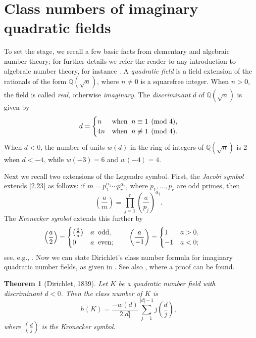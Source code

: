 \documentclass{amsart}
\theoremstyle{plain}
\newtheorem{theorem}{Theorem}[section]
\numberwithin{equation}{section}
\begin{document}
\section{Class numbers of imaginary quadratic fields}\label{sec:4}

To set the stage, we recall a few basic facts from elementary and algebraic
number theory; for further details we refer the reader to any introduction  to
algebraic number theory, for instance \cite{AW}. A {\it quadratic field} is a
field extension of the rationals of the form ${\mathbb Q}(\sqrt{n})$, where
$n\neq 0$ is a squarefree integer. When $n>0$, the field is called {\it real\/},
otherwise {\it imaginary\/}. The {\it discriminant} $d$ of 
${\mathbb Q}(\sqrt{n})$ is given by
\begin{equation}\label{3.1}
d = \begin{cases}
n &\hbox{when}\;\;n\equiv 1\pmod{4},\\
4n &\hbox{when}\;\;n\not\equiv 1\pmod{4}.
\end{cases}
\end{equation}
When $d<0$, the number of units $w(d)$ in the ring of integers of 
${\mathbb Q}(\sqrt{n})$ is 2 when $d<-4$, while $w(-3)=6$ and $w(-4)=4$.

Next we recall two extensions of the Legendre symbol. First,
the {\it Jacobi symbol} extends \eqref{2.23} as follows: if 
$m=p_1^{\alpha_1}\cdots p_r^{\alpha_r}$, where $p_1,\ldots,p_r$ are odd primes,
then 
\[
\left(\frac{a}{m}\right) = \prod_{j=1}^r\left(\frac{a}{p_j}\right)^{\alpha_j}.
\]
The {\it Kronecker symbol} extends this further by
\[
\left(\frac{a}{2}\right) = \begin{cases}
\left(\frac{2}{a}\right) &a\;\;\hbox{odd},\\
0&a\;\;\hbox{even};
\end{cases}\qquad
\left(\frac{a}{-1}\right) = \begin{cases}
1 &a>0,\\
-1 &a<0;
\end{cases}\qquad
\]
see, e.g., \cite[p.~36]{Co1}. Now we can state Dirichlet's class number 
formula for imaginary quadratic number fields, as given in \cite[p.~322]{AW}.
See also \cite[p.~342ff.]{BS}, where a proof can be found.

\begin{theorem}[Dirichlet, 1839]\label{thm:3.1}
Let $K$ be a quadratic number field with discriminant $d<0$. Then the class
number of $K$ is
\begin{equation}\label{3.2}
h(K)=\frac{-w(d)}{2|d|}\sum_{j=1}^{|d|-1}j\left(\frac{d}{j}\right),
\end{equation}
where $(\frac{d}{j})$ is the Kronecker symbol.
\end{theorem}
\end{document}

